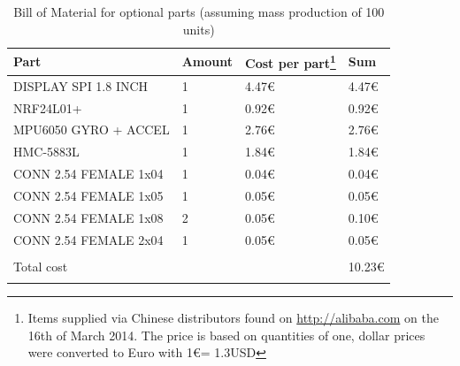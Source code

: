 \documentclass[11pt,a4paper]{article}
\begin{document}
\begin{longtable}{p{}p{}p{}p{}}
\toprule
Part & Amount & Cost per part\footnote{Items supplied via Chinese distributors found on \url{http://alibaba.com} on the 16th of March 2014. The price is based on quantities of one, dollar prices were converted to Euro with 1\euro = 1.3USD } & Sum \\
\midrule
DISPLAY SPI 1.8 INCH & 1 & 4.47\euro & 4.47\euro \\
NRF24L01+ & 1 & 0.92\euro & 0.92\euro \\
MPU6050 GYRO + ACCEL & 1 & 2.76\euro & 2.76\euro \\
HMC-5883L & 1 & 1.84\euro & 1.84\euro \\
CONN 2.54 FEMALE 1x04 & 1 & 0.04\euro & 0.04\euro \\
CONN 2.54 FEMALE 1x05 & 1 & 0.05\euro & 0.05\euro \\
CONN 2.54 FEMALE 1x08 & 2 & 0.05\euro & 0.10\euro \\
CONN 2.54 FEMALE 2x04 & 1 & 0.05\euro & 0.05\euro \\
\hline \\
Total cost& & & 10.23\euro \\
\bottomrule
\caption{Bill of Material for optional parts (assuming mass production of 100 units)}
\label{tbl:bom}
\end{longtable}


\nocite{*}
\printbibliography
{}
\end{document}
